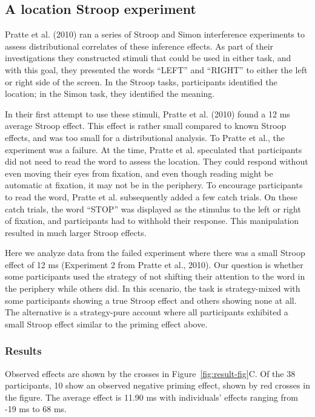 \documentclass[english,man]{apa6}
\theoremstyle{definition}
\theoremstyle{definition}
\theoremstyle{remark}
\begin{document}
\subsection{A location Stroop
experiment}\label{a-location-stroop-experiment}

Pratte et al. (2010) ran a series of Stroop and Simon interference
experiments to assess distributional correlates of these inference
effects. As part of their investigations they constructed stimuli that
could be used in either task, and with this goal, they presented the
words \enquote{LEFT} and \enquote{RIGHT} to either the left or right
side of the screen. In the Stroop tasks, participants identified the
location; in the Simon task, they identified the meaning.

In their first attempt to use these stimuli, Pratte et al. (2010) found
a 12 ms average Stroop effect. This effect is rather small compared to
known Stroop effects, and was too small for a distributional analysis.
To Pratte et al., the experiment was a failure. At the time, Pratte et
al. speculated that participants did not need to read the word to assess
the location. They could respond without even moving their eyes from
fixation, and even though reading might be automatic at fixation, it may
not be in the periphery. To encourage participants to read the word,
Pratte et al. subsequently added a few catch trials. On these catch
trials, the word \enquote{STOP} was displayed as the stimulus to the
left or right of fixation, and participants had to withhold their
response. This manipulation resulted in much larger Stroop effects.

Here we analyze data from the failed experiment where there was a small
Stroop effect of 12 ms (Experiment 2 from Pratte et al., 2010). Our
question is whether some participants used the strategy of not shifting
their attention to the word in the periphery while others did. In this
scenario, the task is strategy-mixed with some participants showing a
true Stroop effect and others showing none at all. The alternative is a
strategy-pure account where all participants exhibited a small Stroop
effect similar to the priming effect above.

\subsubsection{Results}\label{results-1}

Observed effects are shown by the crosses in
Figure~\ref{fig:result-fig}C. Of the 38 participants, 10 show an
observed negative priming effect, shown by red crosses in the figure.
The average effect is 11.90 ms with individuals' effects ranging from
-19 ms to 68 ms.
\end{document}
